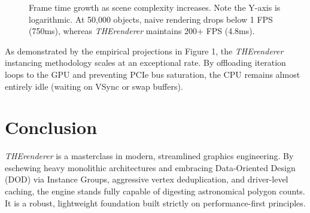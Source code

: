 \documentclass[12pt,a4paper]{article}
\begin{document}
\vspace{1em}
\begin{figure}[h]
\centering
{}
\caption{Frame time growth as scene complexity increases. Note the Y-axis is logarithmic. At 50,000 objects, naive rendering drops below 1 FPS (750ms), whereas \textit{THErenderer} maintains 200+ FPS (4.8ms).}
\end{figure}
\vspace{1em}

As demonstrated by the empirical projections in Figure 1, the \textit{THErenderer} instancing methodology scales at an exceptional rate. By offloading iteration loops to the GPU and preventing PCIe bus saturation, the CPU remains almost entirely idle (waiting on VSync or swap buffers). 

\section{Conclusion}
\textit{THErenderer} is a masterclass in modern, streamlined graphics engineering. By eschewing heavy monolithic architectures and embracing Data-Oriented Design (DOD) via Instance Groups, aggressive vertex deduplication, and driver-level caching, the engine stands fully capable of digesting astronomical polygon counts. It is a robust, lightweight foundation built strictly on performance-first principles.
\end{document}
